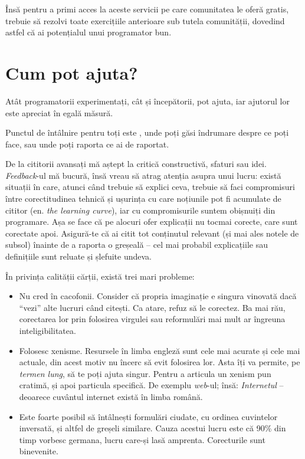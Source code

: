 Însă pentru a primi acces la aceste servicii pe care comunitatea
{\phpro} le oferă gratis, trebuie să rezolvi toate exercițiile anterioare
sub tutela comunității, dovedind astfel că ai potențialul unui
programator bun.

\section*{Cum pot ajuta?}
{}
Atât programatorii experimentați, cât și începătorii, pot ajuta,
iar ajutorul lor este apreciat în egală măsură.

Punctul de întâlnire pentru toți este \phpro, unde poți
găsi îndrumare despre ce poți face, sau unde poți raporta
ce ai de raportat.

De la cititorii avansați mă aștept la critică constructivă, sfaturi sau idei.
\textsl{Feedback}-ul mă bucură, însă vreau să atrag atenția asupra unui lucru:
există situații în care, atunci când trebuie să explici ceva, trebuie să
faci compromisuri între corectitudinea tehnică și ușurința cu care noțiunile
pot fi acumulate de cititor (en. \textsl{the learning curve}), iar cu compromisurile
suntem obișnuiți din programare. Așa se face că pe alocuri ofer explicații
nu tocmai corecte, care sunt corectate apoi. Asigură-te că ai citit tot conținutul
relevant (și mai ales notele de subsol) înainte de a raporta o greșeală --
cel mai probabil explicațiile sau definițiile sunt reluate și șlefuite undeva.

În privința calității cărții, există trei mari probleme:
\begin{itemize}
\item Nu cred în cacofonii. Consider că propria imaginație e singura vinovată
dacă ``vezi'' alte lucruri când citești. Ca atare, refuz să le corectez.
Ba mai rău, corectarea lor prin folosirea virgulei sau reformulări mai mult
ar îngreuna inteligibilitatea.
\item Folosesc xenisme. Resursele în limba engleză sunt cele mai acurate și
cele mai actuale, din acest motiv nu încerc să evit folosirea lor.
Asta îți va permite, pe \textit{termen lung}, să te poți ajuta singur. Pentru a
articula un xenism pun cratimă, și apoi particula specifică. De exemplu
\textsl{web}-ul; însă: \textit{Internetul} -- deoarece cuvântul internet există în
limba română.
\item Este foarte posibil să întâlnești formulări ciudate, cu ordinea
cuvintelor inversată, și altfel de greșeli similare. Cauza acestui lucru este că
90\% din timp vorbesc germana, lucru care-și lasă amprenta.
Corecturile sunt binevenite.
\end{itemize}

